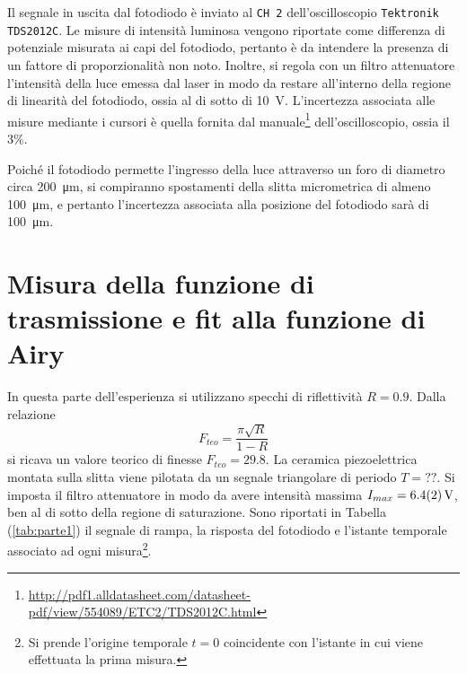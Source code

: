\documentclass[10pt,oneside,a4paper]{article}
\begin{document}
\begin{multicols}{2}
Il segnale in uscita dal fotodiodo è inviato al \texttt{CH 2} dell'oscilloscopio \texttt{Tektronik TDS2012C}. Le misure di intensità luminosa vengono riportate come differenza di potenziale misurata ai capi del fotodiodo, pertanto è da intendere la presenza di un fattore di proporzionalità non noto. Inoltre, si regola con un filtro attenuatore l'intensità della luce emessa dal laser in modo da restare all'interno della regione di linearità del fotodiodo, ossia al di sotto di \SI{10}{V}. L'incertezza associata alle misure mediante i cursori è quella fornita dal manuale\footnote{\url{http://pdf1.alldatasheet.com/datasheet-pdf/view/554089/ETC2/TDS2012C.html}} dell'oscilloscopio, ossia il $3\%$.

Poiché il fotodiodo permette l'ingresso della luce attraverso un foro di diametro circa \SI{200}{\micro m}, si compiranno spostamenti della slitta micrometrica di almeno \SI{100}{\micro m}, e pertanto l'incertezza associata alla posizione del fotodiodo sarà di \SI{100}{\micro m}.

\section{Misura della funzione di trasmissione e fit alla funzione di Airy}
In questa parte dell'esperienza si utilizzano specchi di riflettività $R=0.9$. Dalla relazione \begin{equation}\label{eqn:finesse}
F_{teo} = \frac{\pi\sqrt R}{1-R}
\end{equation}
si ricava un valore teorico di finesse $F_{teo} = 29.8$. La ceramica piezoelettrica montata sulla slitta viene pilotata da un segnale triangolare di periodo $T=??$. Si imposta il filtro attenuatore in modo da avere intensità massima $I_{max} = \SI{6.4\pm0.2}{V}$, ben al di sotto della regione di saturazione. Sono riportati in Tabella (\ref{tab:parte1}) il segnale di rampa, la risposta del fotodiodo e l'istante temporale associato ad ogni misura\footnote{Si prende l'origine temporale $t=0$ coincidente con l'istante in cui viene effettuata la prima misura.}.


\end{multicols}
\end{document}

